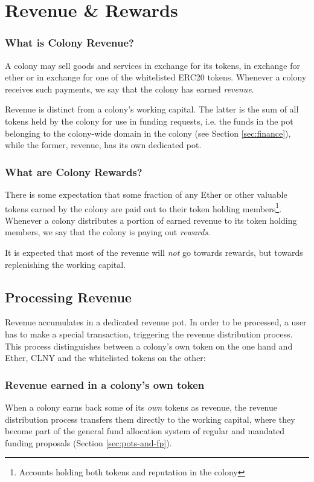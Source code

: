 \section{Revenue \& Rewards}\label{sec:revenue}

\subsubsection*{What is Colony Revenue?}
A colony may sell goods and services in exchange for its tokens, in exchange for ether or in exchange for one of the whitelisted ERC20 tokens. Whenever a colony receives such payments, we say that the colony has earned \emph{revenue}.

Revenue is distinct from a colony's working capital. The latter is the sum of all tokens held by the colony for use in funding requests, i.e. the funds in the pot belonging to the colony-wide domain in the colony (see Section \ref{sec:finance}), while the former, revenue, has its own dedicated pot.

\subsubsection*{What are Colony Rewards?}
There is some expectation that some fraction of any Ether or other valuable tokens earned by the colony are paid out to their token holding members\footnote{Accounts holding both tokens and reputation in the colony}. Whenever a colony distributes a portion of earned revenue to its token holding members, we say that the colony is paying out \emph{rewards}.

It is expected that most of the revenue will \emph{not} go towards rewards, but towards replenishing the working capital.

\subsection{Processing Revenue}
Revenue accumulates in a dedicated revenue pot. In order to be processed, a user has to make a special transaction, triggering the revenue distribution process. This process distinguishes between a colony's own token on the one hand and Ether, CLNY and the whitelisted tokens on the other:

\subsubsection*{Revenue earned in a colony's own token}
When a colony earns back some of its \emph{own} tokens as revenue, the revenue distribution process transfers them directly to the working capital, where they become part of the general fund allocation system of regular and mandated funding proposals (Section \ref{sec:pots-and-fp}).

